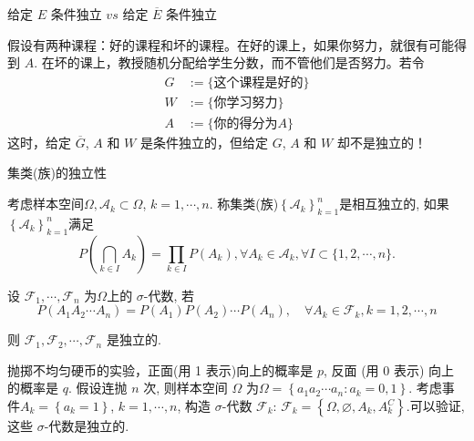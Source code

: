 \documentclass[Prob-All.tex]{subfiles}
\begin{document}
\begin{frame}{给定 $E$ 条件独立 $vs$ 给定 $\overline{E}$ 条件独立}
\begin{exam}
\label{27}
假设有两种课程：好的课程和坏的课程。在好的课上，如果你努力，就很有可能得到 $A$. 在坏的课上，教授随机分配给学生分数，而不管他们是否努力。若令
\begin{align*}
	G&:= \{\mbox{这个课程是好的}\}\\
	W&:= \{\mbox{你学习努力}\}\\
	A&:=\{\mbox{你的得分为} A\}
 \end{align*}
 \pause 这时，给定 $\overline{G}$, $A$ 和 $W$ 是条件独立的，但给定 $G$, $A$ 和 $W$ 却不是独立的！

\end{exam}
\end{frame}

\begin{frame}{集类(族)的独立性}
\begin{defi}
   考虑样本空间$\Omega, \mathcal{A}_{k} \subset \Omega$, $k=1,\cdots, n$. 称集类(族)$\left\{\mathcal{A}_{k}\right\}_{k=1}^{n}$是相互独立的, 如果$\left\{\mathcal{A}_{k}\right\}_{k=1}^{n}$满足
\[
P\left(\bigcap_{k \in I} A_{k}\right)=\prod_{k \in I} P\left(A_{k}\right),  \forall A_{k} \in \mathcal{A}_{k},  \forall I \subset\{1,2, \cdots, n\}.
\]
\end{defi}
\pause

\begin{thm}
   设 \( \mathcal{F}_{1}, \cdots, \mathcal{F}_{n} \) 为\( \Omega \)上的 \( \sigma\)-代数, 若
\[
P\left(A_{1} A_{2} \cdots A_{n}\right)=P\left(A_{1}\right) P\left(A_{2}\right) \cdots P\left(A_{n}\right), \quad \forall A_{k} \in \mathcal{F}_{k}, k=1,2, \cdots, n
\]

则 \( \mathcal{F}_{1}, \mathcal{F}_{2}, \cdots, \mathcal{F}_{n} \) 是独立的.
\end{thm}

\pause

\begin{exam}
   抛掷不均匀硬币的实验，正面(用 1 表示)向上的概率是 \( p \), 反面 (用 0 表示) 向上的概率是 \( q \). 假设连抛 \( n \) 次, 则样本空间 \( \Omega \) 为$\Omega=\left\{a_{1} a_{2} \cdots a_{n}: a_{k}=0,1\right\}$. \pause 考虑事件$A_{k}=\left\{a_{k}=1\right\}$, $k=1,\cdots, n$, 构造 \( \sigma\)-代数 \( \mathcal{F}_{k} \): \pause $\mathcal{F}_{k}=\left\{\Omega, \varnothing, A_{k}, A_{k}^{C}\right\}$.\pause  可以验证, 这些 \( \sigma\)-代数是独立的.
\end{exam}


\end{frame}
\end{document}
